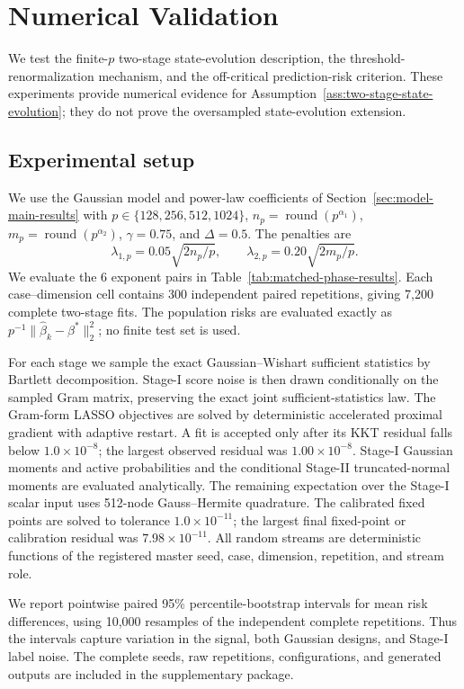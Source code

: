 \section{Numerical Validation}
\label{app:numerical-validation}

We test the finite-$p$ two-stage state-evolution description, the
threshold-renormalization mechanism, and the off-critical prediction-risk
criterion. These experiments provide numerical evidence for
Assumption~\ref{ass:two-stage-state-evolution}; they do not prove the
oversampled state-evolution extension.

\subsection{Experimental setup}
\label{app:numerical-validation-setup}

We use the Gaussian model and power-law coefficients of
Section~\ref{sec:model-main-results} with
$p\in\{128,256,512,1024\}$, $n_p=\operatorname{round}(p^{\alpha_1})$,
$m_p=\operatorname{round}(p^{\alpha_2})$, $\gamma=0.75$, and
$\Delta=0.5$.
The penalties are
\[
\lambda_{1,p}=0.05\sqrt{2n_p/p},\qquad
\lambda_{2,p}=0.20\sqrt{2m_p/p}.
\]
We evaluate the 6 exponent pairs in
Table~\ref{tab:matched-phase-results}. Each case--dimension cell contains
300
independent paired repetitions, giving 7,200 complete
two-stage fits. The population risks are evaluated exactly as
$p^{-1}\|\widehat\beta_k-\beta^\ast\|_2^2$; no finite test set is used.

For each stage we sample the exact Gaussian--Wishart sufficient statistics by
Bartlett decomposition. Stage-I score noise is then drawn conditionally on the
sampled Gram matrix, preserving the exact joint sufficient-statistics law.
The Gram-form LASSO objectives are solved by deterministic accelerated proximal
gradient with adaptive restart. A fit is accepted only after its KKT residual
falls below $1.0\times10^{-8}$; the largest observed residual was
$1.00\times10^{-8}$. Stage-I Gaussian moments and active probabilities and the
conditional Stage-II truncated-normal moments are evaluated analytically. The
remaining expectation over the Stage-I scalar input uses
512-node Gauss--Hermite quadrature. The
calibrated fixed points are solved to tolerance
$1.0\times10^{-11}$;
the largest final fixed-point or calibration residual was
$7.98\times10^{-11}$. All random streams are deterministic functions of the
registered master seed, case, dimension, repetition, and stream role.

We report pointwise paired 95\% percentile-bootstrap intervals for mean risk
differences,
using 10,000 resamples of the independent complete
repetitions. Thus the
intervals capture variation in the signal, both Gaussian designs, and Stage-I
label noise. The complete seeds, raw repetitions, configurations, and generated
outputs are included in the supplementary package.

